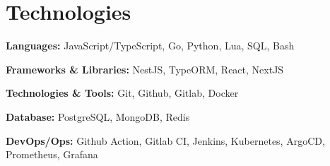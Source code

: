 \section{Technologies}

\begin{onecolentry}
	\textbf{Languages:}
	JavaScript/TypeScript,
	Go,
	Python,
	Lua,
	SQL,
	Bash
\end{onecolentry}

\vspace{0.2 cm}

\begin{onecolentry}
	\textbf{Frameworks \& Libraries:}
	NestJS,
	TypeORM,
	React,
	NextJS
\end{onecolentry}

\vspace{0.2 cm}

\begin{onecolentry}
	\textbf{Technologies \& Tools:}
	Git,
	Github,
	Gitlab,
	Docker
\end{onecolentry}

\vspace{0.2 cm}

\begin{onecolentry}
	\textbf{Database:}
	PostgreSQL,
	MongoDB,
	Redis
\end{onecolentry}

\vspace{0.2 cm}

\begin{onecolentry}
	\textbf{DevOps/Ops:}
	Github Action,
	Gitlab CI,
	Jenkins,
	Kubernetes,
	ArgoCD,
	Prometheus,
	Grafana
\end{onecolentry}

%
%
%
